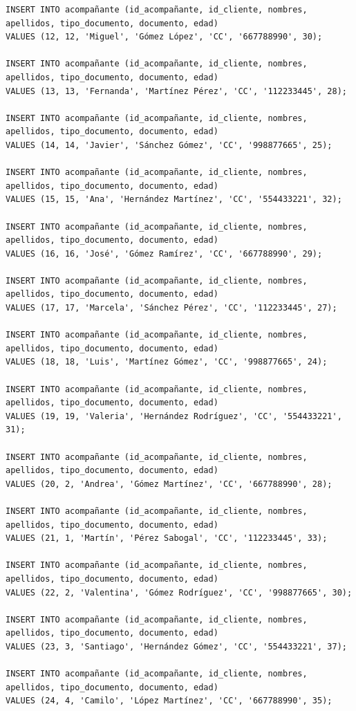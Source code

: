 \documentclass{article}
\begin{document}
\begin{lstlisting}
INSERT INTO acompañante (id_acompañante, id_cliente, nombres, apellidos, tipo_documento, documento, edad)
VALUES (12, 12, 'Miguel', 'Gómez López', 'CC', '667788990', 30);

INSERT INTO acompañante (id_acompañante, id_cliente, nombres, apellidos, tipo_documento, documento, edad)
VALUES (13, 13, 'Fernanda', 'Martínez Pérez', 'CC', '112233445', 28);

INSERT INTO acompañante (id_acompañante, id_cliente, nombres, apellidos, tipo_documento, documento, edad)
VALUES (14, 14, 'Javier', 'Sánchez Gómez', 'CC', '998877665', 25);

INSERT INTO acompañante (id_acompañante, id_cliente, nombres, apellidos, tipo_documento, documento, edad)
VALUES (15, 15, 'Ana', 'Hernández Martínez', 'CC', '554433221', 32);

INSERT INTO acompañante (id_acompañante, id_cliente, nombres, apellidos, tipo_documento, documento, edad)
VALUES (16, 16, 'José', 'Gómez Ramírez', 'CC', '667788990', 29);

INSERT INTO acompañante (id_acompañante, id_cliente, nombres, apellidos, tipo_documento, documento, edad)
VALUES (17, 17, 'Marcela', 'Sánchez Pérez', 'CC', '112233445', 27);

INSERT INTO acompañante (id_acompañante, id_cliente, nombres, apellidos, tipo_documento, documento, edad)
VALUES (18, 18, 'Luis', 'Martínez Gómez', 'CC', '998877665', 24);

INSERT INTO acompañante (id_acompañante, id_cliente, nombres, apellidos, tipo_documento, documento, edad)
VALUES (19, 19, 'Valeria', 'Hernández Rodríguez', 'CC', '554433221', 31);

INSERT INTO acompañante (id_acompañante, id_cliente, nombres, apellidos, tipo_documento, documento, edad)
VALUES (20, 2, 'Andrea', 'Gómez Martínez', 'CC', '667788990', 28);

INSERT INTO acompañante (id_acompañante, id_cliente, nombres, apellidos, tipo_documento, documento, edad)
VALUES (21, 1, 'Martín', 'Pérez Sabogal', 'CC', '112233445', 33);

INSERT INTO acompañante (id_acompañante, id_cliente, nombres, apellidos, tipo_documento, documento, edad)
VALUES (22, 2, 'Valentina', 'Gómez Rodríguez', 'CC', '998877665', 30);

INSERT INTO acompañante (id_acompañante, id_cliente, nombres, apellidos, tipo_documento, documento, edad)
VALUES (23, 3, 'Santiago', 'Hernández Gómez', 'CC', '554433221', 37);

INSERT INTO acompañante (id_acompañante, id_cliente, nombres, apellidos, tipo_documento, documento, edad)
VALUES (24, 4, 'Camilo', 'López Martínez', 'CC', '667788990', 35);


\end{lstlisting}
\end{document}
